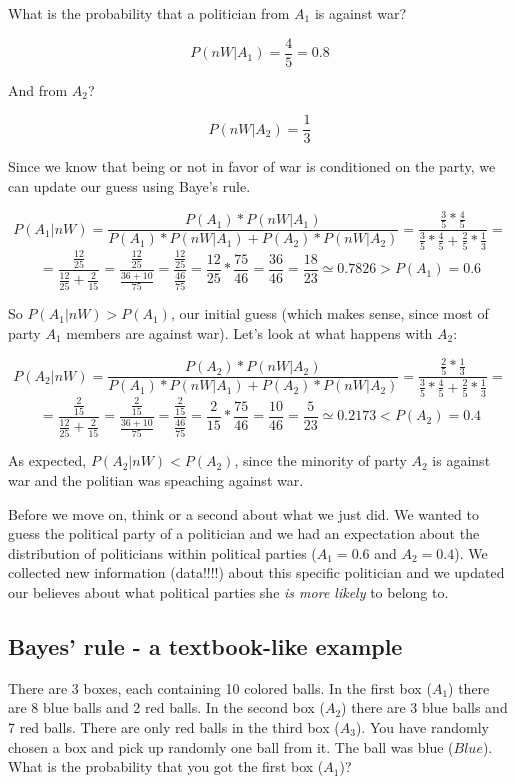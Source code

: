 \documentclass[11pt]{article}
\begin{document}
	What is the probability that a politician from $A_1$ is against war? 
	
	\[P(nW|A_1) =  \frac{4}{5} = 0.8\]
	
	And from $A_2$?
	
	\[P(nW|A_2) = \frac{1}{3}\]
	
	Since we know that being or not in favor of war is conditioned on the party, we can update our guess using Baye's rule.
	
	\[P(A_1|nW) = \frac{P(A_1)*P(nW|A_1)}{P(A_1)*P(nW|A_1)+P(A_2)*P(nW|A_2)} 
	= \frac{\frac{3}{5} * \frac{4}{5}}{\frac{3}{5} * \frac{4}{5} + \frac{2}{5} * \frac{1}{3}} =\]
	\[= \frac{\frac{12}{25}}{\frac{12}{25} + \frac{2}{15}} = \frac{\frac{12}{25}}{\frac{36+10}{75}} = \frac{\frac{12}{25}}{\frac{46}{75}} = \frac{12}{25} * \frac{75}{46} = \frac{36}{46} = \frac{18}{23} \simeq 0.7826 > P(A_1) = 0.6\]	
	
	So $P(A_1|nW) > P(A_1)$, our initial guess (which makes sense, since most of party $A_1$ members are against war). Let's look at what happens with $A_2$:

	\[P(A_2|nW) = \frac{P(A_2)*P(nW|A_2)}{P(A_1)*P(nW|A_1)+P(A_2)*P(nW|A_2)} 
	= \frac{\frac{2}{5} * \frac{1}{3}}{\frac{3}{5} * \frac{4}{5} + \frac{2}{5} * \frac{1}{3}} =\]
	\[= \frac{\frac{2}{15}}{\frac{12}{25} + \frac{2}{15}} = \frac{\frac{2}{15}}{\frac{36+10}{75}} = \frac{\frac{2}{15}}{\frac{46}{75}} = \frac{2}{15} * \frac{75}{46} = \frac{10}{46} = \frac{5}{23} \simeq 0.2173 < P(A_2) = 0.4\]	

	As expected, $P(A_2|nW) < P(A_2)$, since the minority of party $A_2$ is against war and the politian was speaching against war.
	
	Before we move on, think or a second about what we just did. We wanted to guess the political party of a politician and we had an expectation about the distribution of politicians within political parties ($A_1 = 0.6$ and $A_2 = 0.4$). We collected new information (data!!!!) about this specific politician and we updated our believes about what political parties she \emph{is more likely} to belong to.

	\subsection*{Bayes' rule - a textbook-like example}

	There are 3 boxes, each containing 10 colored balls. In the first box ($A_1$) there are 8 blue balls and 2 red balls. In the second box ($A_2$) there are 3 blue balls and 7 red balls. There are only red balls in the third box ($A_3$). You have randomly chosen a box and pick up randomly one ball from it. The ball was blue ($Blue$). What is the probability that you got the first box ($A_1$)?
	
\end{document}
